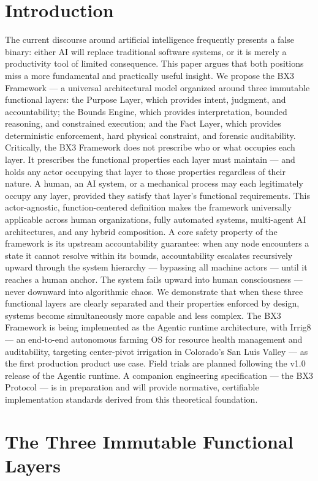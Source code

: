\documentclass[11pt, a4paper]{article}
\begin{document}
\section{Introduction}
The current discourse around artificial intelligence frequently presents a false binary: either AI will replace traditional software systems, or it is merely a productivity tool of limited consequence. This paper argues that both positions miss a more fundamental and practically useful insight. We propose the BX3 Framework --- a universal architectural model organized around three immutable functional layers: the Purpose Layer, which provides intent, judgment, and accountability; the Bounds Engine, which provides interpretation, bounded reasoning, and constrained execution; and the Fact Layer, which provides deterministic enforcement, hard physical constraint, and forensic auditability. Critically, the BX3 Framework does not prescribe who or what occupies each layer. It prescribes the functional properties each layer must maintain --- and holds any actor occupying that layer to those properties regardless of their nature. A human, an AI system, or a mechanical process may each legitimately occupy any layer, provided they satisfy that layer's functional requirements. This actor-agnostic, function-centered definition makes the framework universally applicable across human organizations, fully automated systems, multi-agent AI architectures, and any hybrid composition. A core safety property of the framework is its upstream accountability guarantee: when any node encounters a state it cannot resolve within its bounds, accountability escalates recursively upward through the system hierarchy --- bypassing all machine actors --- until it reaches a human anchor. The system fails upward into human consciousness --- never downward into algorithmic chaos. We demonstrate that when these three functional layers are clearly separated and their properties enforced by design, systems become simultaneously more capable and less complex. The BX3 Framework is being implemented as the Agentic runtime architecture, with Irrig8 --- an end-to-end autonomous farming OS for resource health management and auditability, targeting center-pivot irrigation in Colorado's San Luis Valley --- as the first production product use case. Field trials are planned following the v1.0 release of the Agentic runtime. A companion engineering specification --- the BX3 Protocol --- is in preparation and will provide normative, certifiable implementation standards derived from this theoretical foundation.
\section{The Three Immutable Functional Layers}
\end{document}
